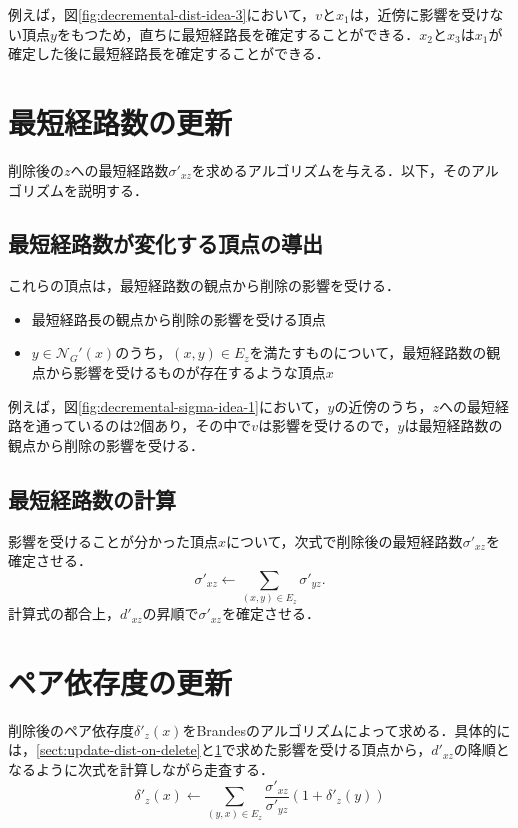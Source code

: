 例えば，図\ref{fig:decremental-dist-idea-3}において，$v$と$x_1$は，近傍に影響を受けない頂点$y$をもつため，直ちに最短経路長を確定することができる．$x_2$と$x_3$は$x_1$が確定した後に最短経路長を確定することができる．

\section{最短経路数の更新}
\label{sect:update-sigma-on-delete}

削除後の$z$への最短経路数$\sigma'_{xz}$を求めるアルゴリズムを与える．以下，そのアルゴリズムを説明する．

\subsection{最短経路数が変化する頂点の導出}
これらの頂点は，最短経路数の観点から削除の影響を受ける．

\begin{itemize}
\item 最短経路長の観点から削除の影響を受ける頂点
\item $y\in\mathcal{N}_G'(x)$のうち，$(x,y)\in E_z$を満たすものについて，最短経路数の観点から影響を受けるものが存在するような頂点$x$
\end{itemize}

例えば，図\ref{fig:decremental-sigma-idea-1}において，$y$の近傍のうち，$z$への最短経路を通っているのは2個あり，その中で$v$は影響を受けるので，$y$は最短経路数の観点から削除の影響を受ける．

\subsection{最短経路数の計算}
影響を受けることが分かった頂点$x$について，次式で削除後の最短経路数$\sigma'_{xz}$を確定させる．
\[ \sigma'_{xz}\gets\sum_{(x,y)\in E_z}\sigma'_{yz}. \]
計算式の都合上，$d'_{xz}$の昇順で$\sigma'_{xz}$を確定させる．

\section{ペア依存度の更新}
\label{sect:update-delta-on-delete}

削除後のペア依存度$\delta'_z(x)$をBrandesのアルゴリズムによって求める．具体的には，\ref{sect:update-dist-on-delete}と\ref{sect:update-sigma-on-delete}で求めた影響を受ける頂点から，$d'_{xz}$の降順となるように次式を計算しながら走査する．
\[ \delta'_{z}(x)\gets\sum_{(y,x)\in E_z}\frac{\sigma'_{xz}}{\sigma'_{yz}}(1+\delta'_z(y)) \]

